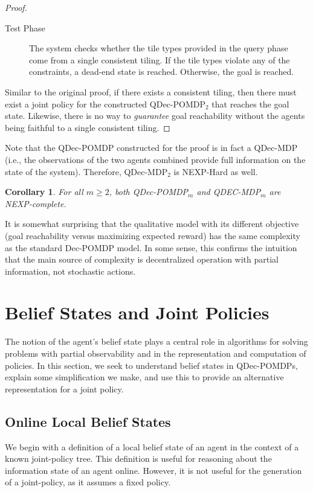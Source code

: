 \documentclass[letterpaper]{article}
\newtheorem{corollary}{Corollary}
\theoremstyle{definition}
\begin{document}
\begin{proof}
\begin{description}
\item [Test Phase]  The system checks whether
the tile types provided in the query phase come from a single consistent tiling. If the tile types violate any of the constraints, a dead-end state is reached.  Otherwise, the goal is reached.

\end{description}
Similar to the original proof, if there exists a consistent tiling, then there must exist a joint policy for the constructed QDec-POMDP$_2$ that reaches the goal state. Likewise, there is no way to \emph{guarantee} goal reachability without the agents being faithful to a single consistent tiling.
\end{proof}

Note that the QDec-POMDP constructed for the proof is in fact a QDec-MDP (i.e., the observations of the two agents combined provide full information on the state of the system).  Therefore, QDec-MDP$_2$ is NEXP-Hard as well.

\begin{corollary}
For all $m\geq2$, both QDec-POMDP$_m$ and QDEC-MDP$_m$ are NEXP-complete.
\end{corollary}

It is somewhat surprising that the qualitative model with its different objective (goal reachability versus maximizing expected reward) has the same complexity as the standard Dec-POMDP model. In some sense, this confirms the intuition that the main source of complexity is decentralized operation with partial information, not stochastic actions.

\section{Belief States and Joint Policies}
The notion of the agent's belief state plays a central role in algorithms for solving problems with partial observability and in the representation and computation of policies. In this section, we seek to understand belief states in QDec-POMDPs, explain some simplification we %
make, and use this to provide an alternative representation for a joint policy.


\subsection{Online Local Belief States}
We begin with a definition of a local belief state of an agent in the context of a known joint-policy tree. This definition is useful for reasoning about the information state of an agent online.  However, it is not useful for the generation of a joint-policy, as it assumes a fixed policy.
\end{document}
